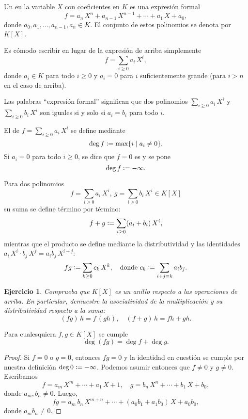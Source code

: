 \documentclass{article}
\theoremstyle{plain}
\newtheorem{ejerc}{Ejercicio}
\begin{document}
\begin{definicion}
  Un  en la variable $X$ con coeficientes en $K$ es una
  expresión formal
  $$f = a_n\,X^n + a_{n-1}\,X^{n-1} + \cdots + a_1\,X + a_0,$$
  donde $a_0, a_1, \ldots, a_{n-1}, a_n \in K$. El conjunto de estos polinomios
  se denota por $K [X]$.
\end{definicion}

Es cómodo escribir en lugar de la expresión de arriba simplemente
$$f = \sum_{i\ge 0} a_i\,X^i,$$
donde $a_i \in K$ para todo $i \ge 0$ y $a_i = 0$ para $i$ suficientemente
grande (para $i > n$ en el caso de arriba).

Las palabras ``expresión formal'' significan que dos polinomios
$\sum_{i\ge 0} a_i\,X^i$ y $\sum_{i\ge 0} b_i\,X^i$ son iguales si y solo si
$a_i = b_i$ para todo $i$.

\begin{definicion}
  El  de $f = \sum_{i\ge 0} a_i\,X^i$ se define mediante
  $$\deg f \mathrel{\mathop:}= \max \{ i \mid a_i \ne 0 \}.$$
  Si $a_i = 0$ para todo $i \ge 0$, se dice que $f = 0$ es
   y se pone
  $$\deg f \mathrel{\mathop:}= -\infty.$$
\end{definicion}

\begin{definicion}
  Para dos polinomios
  $$f = \sum_{i\ge 0} a_i\,X^i, ~ g = \sum_{i\ge 0} b_i\,X^i \in K[X]$$
  su suma se define término por término:
  $$f + g \mathrel{\mathop:}= \sum_{i\ge 0} (a_i + b_i)\,X^i,$$
  mientras que el producto se define mediante la distributividad y las
  identidades $a_i\,X^i \cdot b_j\, X^j = a_ib_j\,X^{i+j}$:
  $$fg \mathrel{\mathop:}= \sum_{k\ge 0} c_k\,X^k, \quad \text{donde } c_k \mathrel{\mathop:}= \sum_{i+j = k} a_i b_j.$$
\end{definicion}

\begin{ejerc}
  Comprueba que $K [X]$ es un anillo respecto a las operaciones de arriba. En
  particular, demuestre la asociatividad de la multiplicación y su
  distributividad respecto a la suma:
  $$(fg)\,h = f\,(gh), \quad (f + g)\,h = fh + gh.$$
\end{ejerc}

\begin{proposicion}
  Para cualesquiera $f,g \in K [X]$ se cumple
  $$\deg (fg) = \deg f + \deg g.$$

\begin{proof}
  Si $f = 0$ o $g = 0$, entonces $fg = 0$ y la identidad en cuestión se cumple
  por nuestra definición $\deg 0 \mathrel{\mathop:}= -\infty$. Podemos asumir entonces que
  $f \ne 0$ y $g \ne 0$. Escribamos
  $$f = a_m\,X^m + \cdots + a_1\,X + 1, \quad g = b_n\,X^n + \cdots + b_1\,X + b_0,$$
  donde $a_m, b_n \ne 0$. Luego,
  $$fg = a_m\,b_n\,X^{m+n} + \cdots + (a_0 b_1 + a_1 b_0)\,X + a_0 b_0,$$
  donde $a_m b_n \ne 0$.
\end{proof}
\end{proposicion}
\end{document}
